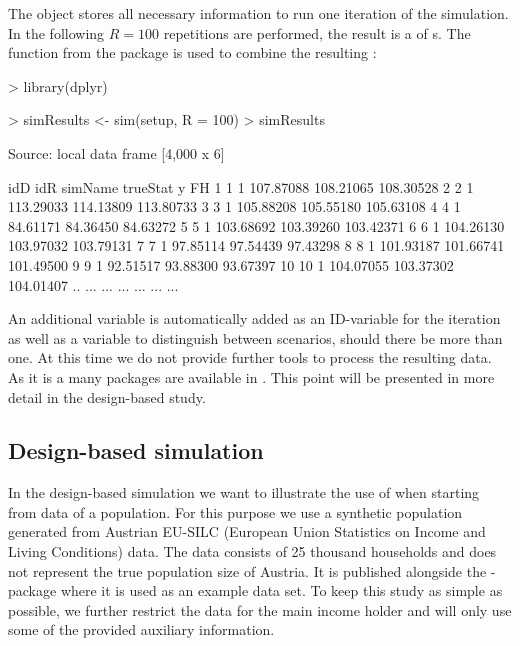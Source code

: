 \documentclass[article]{ajs}
\begin{document}
The object  stores all necessary information to run one iteration of the simulation. In the following $R = 100$ repetitions are performed, the result is a  of s. The function  from the package  is used to combine the resulting :

\begin{Schunk}
\begin{Sinput}
> library(dplyr)
\end{Sinput}
\end{Schunk}
\begin{Schunk}
\begin{Sinput}
> simResults <- sim(setup, R = 100) %
> simResults %
\end{Sinput}
\begin{Soutput}
Source: local data frame [4,000 x 6]

   idD idR simName  trueStat         y        FH
1    1   1         107.87088 108.21065 108.30528
2    2   1         113.29033 114.13809 113.80733
3    3   1         105.88208 105.55180 105.63108
4    4   1          84.61171  84.36450  84.63272
5    5   1         103.68692 103.39260 103.42371
6    6   1         104.26130 103.97032 103.79131
7    7   1          97.85114  97.54439  97.43298
8    8   1         101.93187 101.66741 101.49500
9    9   1          92.51517  93.88300  93.67397
10  10   1         104.07055 103.37302 104.01407
.. ... ...     ...       ...       ...       ...
\end{Soutput}
\end{Schunk}

An additional variable  is automatically added as an ID-variable for the iteration as well as a variable  to distinguish between scenarios, should there be more than one. At this time we do not provide further tools to process the resulting data. As it is a  many packages are available in . This point will be presented in more detail in the design-based study.

\subsection{Design-based simulation}
\label{sec:csDesign}

In the design-based simulation we want to illustrate the use of  when starting from data of a population. For this purpose we use a synthetic population generated from Austrian EU-SILC (European Union Statistics on Income and Living Conditions) data. The data consists of 25 thousand households and does not represent the true population size of Austria. It is published alongside the -package  \citep{Alf10} where it is used as an example data set. To keep this study as simple as possible, we further restrict the data for the main income holder and will only use some of the provided auxiliary information.
\end{document}
